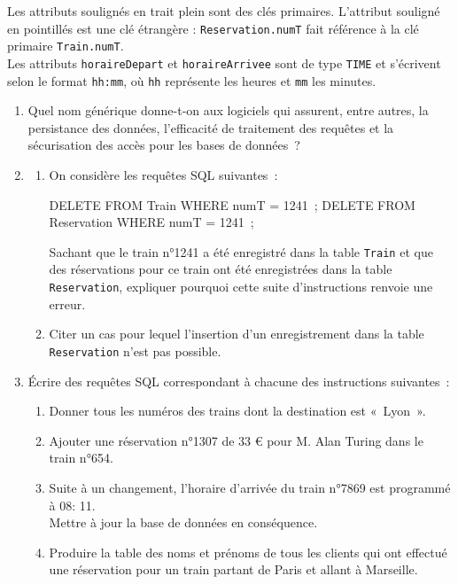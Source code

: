 \documentclass[a4paper,12pt,french]{book}
\begin{document}
    Les attributs soulignés en trait plein sont des clés primaires. L’attribut souligné en pointillés est une clé étrangère : \texttt{Reservation.numT} fait référence à la clé primaire \texttt{Train.numT}.\\

    Les attributs \texttt{horaireDepart} et \texttt{horaireArrivee} sont de type \texttt{TIME} et s’écrivent selon le format \texttt{hh:mm}, où \texttt{hh} représente les heures et \texttt{mm} les minutes.\\

    \begin{enumerate}[\bfseries 1.]
        \item Quel nom générique donne-t-on aux logiciels qui assurent, entre autres, la persistance des données, l’efficacité de traitement des requêtes et la sécurisation des accès pour les bases de données ?
        \item \begin{enumerate}[\bfseries a.]
            \item On considère les requêtes SQL suivantes :

\begin{sql}
DELETE FROM Train WHERE numT = 1241 ;
DELETE FROM Reservation WHERE numT = 1241 ;
\end{sql}

            Sachant que le train n°1241 a été enregistré dans la table \texttt{Train} et que des réservations pour ce train ont été enregistrées dans la table \texttt{Reservation}, expliquer pourquoi cette suite d’instructions renvoie une erreur.
            \item Citer un cas pour lequel l’insertion d’un enregistrement dans la table \texttt{Reservation} n’est pas possible.

        \end{enumerate}
        \item Écrire des requêtes SQL correspondant à chacune des instructions suivantes :
        \begin{enumerate}[\bfseries a.]

            \item Donner tous les numéros des trains dont la destination est « Lyon ».
            \item Ajouter une réservation n°1307 de 33 € pour M. Alan Turing dans le train n°654.
            \item Suite à un changement, l’horaire d’arrivée du train n°7869 est programmé à 08: 11.\\
            Mettre à jour la base de données en conséquence.
            \item Produire la table des noms et prénoms de tous les clients qui ont effectué une réservation pour un train partant de Paris et allant à Marseille.
        \end{enumerate}
    \end{enumerate}
\end{document}
